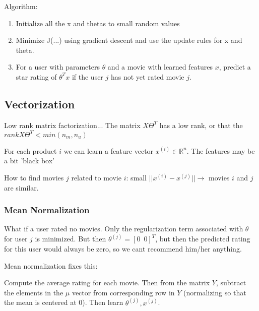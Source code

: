 \documentclass{article}
\begin{document}
Algorithm:


\begin{enumerate}
    \item Initialize all the x and thetas to small random values
    \item Minimize J(...) using gradient descent and use the update rules for x and theta.
    \item For a user with parameters $\theta$ and a movie with learned features $x$, predict a star rating of $\theta^T x$ if the user $j$ has not yet rated movie $j$.
\end{enumerate}



\subsection{Vectorization}

 Low rank matrix factorization... The matrix $X \Theta^T$ has a low rank, or that the $rank X \Theta^T < min(n_m, n_u)$
 
 
 
For each product $i$ we can learn a feature vector $x^{(i)} \in \mathbb{R}^n$. The features may be a bit 'black box'

How to find movies $j$ related to movie $i$:
 small $\vert \vert x^{(i)} - x^{(j)} \vert \vert \longrightarrow$ movies $i$ and $j$ are similar.


 
 \subsubsection{Mean Normalization}
 
 \begin{myboxr}
What if a user rated no movies. Only the regularization term associated with $\theta$ for user $j$ is minimized. But then $\theta^{(j)} = [ 0 \,\,\, 0 ]^T$, but then the predicted rating for this user would always be zero, so we cant recommend him/her anything.
\end{myboxr}



Mean normalization fixes this:
 
 Compute the average rating for each movie. Then from the matrix $Y$, subtract the elements in the $\mu$ vector from corresponding row in $Y$ (normalizing so that the mean is centered at 0). Then learn $\theta^{(j)}, x^{(j)}$.
 
 \hspace{1pt}
 
\end{document}

